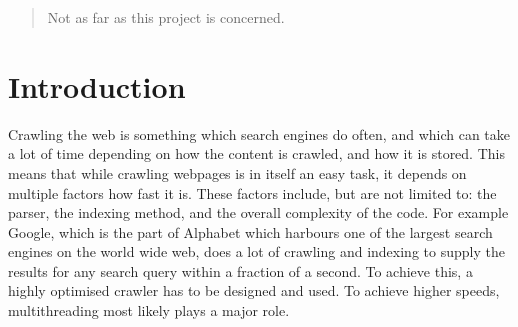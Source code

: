\documentclass{sig-alternate-05-2015}
\begin{document}
%
\author{
%
%
\alignauthor
Simon Klaver\\
       \\
}
\date{}

\maketitle
\begin{abstract}
Not as far as this project is concerned.
\end{abstract}



\section{Introduction}
Crawling the web is something which search engines do often, and which can take a lot of time depending on how the content is crawled, and how it is stored. This means that while crawling webpages is in itself an easy task, it depends on multiple factors how fast it is. These factors include, but are not limited to: the parser, the indexing method, and the overall complexity of the code. For example Google, which is the part of Alphabet which harbours one of the largest search engines on the world wide web, does a lot of crawling and indexing to supply the results for any search query within a fraction of a second. To achieve this, a highly optimised crawler has to be designed and used. To achieve higher speeds, multithreading most likely plays a major role.
\end{document}
